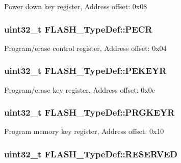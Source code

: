 Power down key register, Address offset\-: 0x08 \hypertarget{struct_f_l_a_s_h___type_def_a58afa3377dd5f4ffa93eb3da4c653cba}{
\subsubsection[{P\-E\-C\-R}]{ uint32\-\_\-t F\-L\-A\-S\-H\-\_\-\-Type\-Def\-::\-P\-E\-C\-R}}\label{struct_f_l_a_s_h___type_def_a58afa3377dd5f4ffa93eb3da4c653cba}
Program/erase control register, Address offset\-: 0x04 \hypertarget{struct_f_l_a_s_h___type_def_a3c470f54858e246365f56e5fe4d2a618}{
\subsubsection[{P\-E\-K\-E\-Y\-R}]{ uint32\-\_\-t F\-L\-A\-S\-H\-\_\-\-Type\-Def\-::\-P\-E\-K\-E\-Y\-R}}\label{struct_f_l_a_s_h___type_def_a3c470f54858e246365f56e5fe4d2a618}
Program/erase key register, Address offset\-: 0x0c \hypertarget{struct_f_l_a_s_h___type_def_a98a43d6cc0dfca44214d5e78115e8c51}{
\subsubsection[{P\-R\-G\-K\-E\-Y\-R}]{ uint32\-\_\-t F\-L\-A\-S\-H\-\_\-\-Type\-Def\-::\-P\-R\-G\-K\-E\-Y\-R}}\label{struct_f_l_a_s_h___type_def_a98a43d6cc0dfca44214d5e78115e8c51}
Program memory key register, Address offset\-: 0x10 \hypertarget{struct_f_l_a_s_h___type_def_ad381422d591d7595a9cb57bb87f70153}{
\subsubsection[{R\-E\-S\-E\-R\-V\-E\-D}]{\setlength{\rightskip}{0pt plus 5cm}uint32\-\_\-t F\-L\-A\-S\-H\-\_\-\-Type\-Def\-::\-R\-E\-S\-E\-R\-V\-E\-D}}\label{struct_f_l_a_s_h___type_def_ad381422d591d7595a9cb57bb87f70153}
